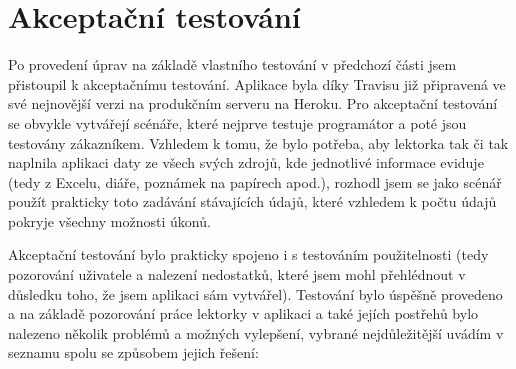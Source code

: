     \section{Akceptační testování}
    Po provedení úprav na základě vlastního testování v předchozí části jsem přistoupil k akceptačnímu testování. Aplikace byla díky Travisu již připravená ve své nejnovější verzi na produkčním serveru na Heroku. Pro akceptační testování se obvykle vytvářejí scénáře, které nejprve testuje programátor a poté jsou testovány zákazníkem. Vzhledem k tomu, že bylo potřeba, aby lektorka tak či tak naplnila aplikaci daty ze všech svých zdrojů, kde jednotlivé informace eviduje (tedy z Excelu, diáře, poznámek na papírech apod.), rozhodl jsem se jako scénář použít prakticky toto zadávání stávajících údajů, které vzhledem k počtu údajů pokryje všechny možnosti úkonů.
    
    Akceptační testování bylo prakticky spojeno i s testováním použitelnosti (tedy pozorování uživatele a nalezení nedostatků, které jsem mohl přehlédnout v důsledku toho, že jsem aplikaci sám vytvářel). Testování bylo úspěšně provedeno a na základě pozorování práce lektorky v aplikaci a také jejích postřehů bylo nalezeno několik problémů a možných vylepšení, vybrané nejdůležitější uvádím v seznamu spolu se způsobem jejich řešení:
    
